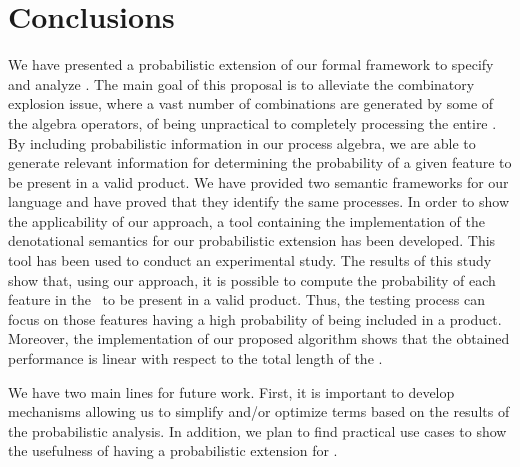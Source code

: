 \section{Conclusions}
\label{section:jstat:concs}

We have presented a probabilistic extension of our
formal framework to specify and analyze \SPLs. The main goal of this
proposal is to alleviate the combinatory explosion issue, where a vast
number of combinations are generated by some of the algebra operators,
of being unpractical to completely processing the entire \SPL. By including probabilistic information in our process algebra, we are able to generate relevant information for determining the probability
of a given feature to be present in a valid product. We have provided two semantic frameworks for our language and have proved that they identify the same processes.
%
In order to show the applicability of our approach, a tool containing the
implementation of the denotational semantics for our probabilistic extension
has been developed. This tool has been used to conduct an experimental study.
%
The results of this study show that, using our approach, it is possible to compute
the probability of each feature in the \SPL\ to be present in a valid product.
Thus, the testing process can focus on those features having a high probability
of being included in a product. Moreover, the implementation of our proposed algorithm
shows that the obtained performance is linear with respect to the total
length of the \SPL.
  


%
%
%
%
We have two main lines for future work. First, it is important to develop 
mechanisms allowing us to simplify and/or optimize terms
based on the results of the probabilistic analysis. In addition, 
we plan to find practical use cases to show the usefulness of having a probabilistic extension for \SPLs.



